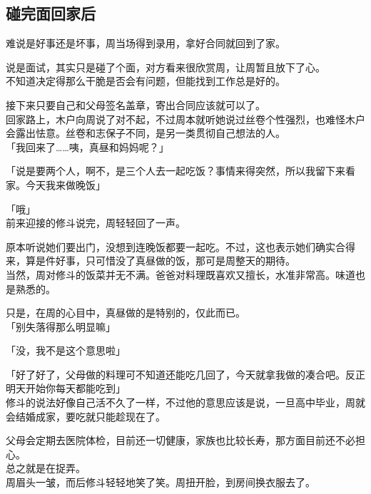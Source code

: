 \subsection{碰完面回家后}

难说是好事还是坏事，周当场得到录用，拿好合同就回到了家。

说是面试，其实只是碰了个面，对方看来很欣赏周，让周暂且放下了心。\\

不知道决定得那么干脆是否会有问题，但能找到工作总是好的。

接下来只要自己和父母签名盖章，寄出合同应该就可以了。\\

回家路上，木户向周说了对不起，不过周本就听她说过丝卷个性强烈，也难怪木户会露出怯意。丝卷和志保子不同，是另一类贯彻自己想法的人。\\

「我回来了……咦，真昼和妈妈呢？」

「说是要两个人，啊不，是三个人去一起吃饭？事情来得突然，所以我留下来看家。今天我来做晚饭」

「哦」\\

前来迎接的修斗说完，周轻轻回了一声。

原本听说她们要出门，没想到连晚饭都要一起吃。不过，这也表示她们确实合得来，算是件好事，只可惜没了真昼做的饭，那可是周整天的期待。\\

当然，周对修斗的饭菜并无不满。爸爸对料理既喜欢又擅长，水准非常高。味道也是熟悉的。

只是，在周的心目中，真昼做的是特别的，仅此而已。\\

「别失落得那么明显嘛」

「没，我不是这个意思啦」

「好了好了，父母做的料理可不知道还能吃几回了，今天就拿我做的凑合吧。反正明天开始你每天都能吃到」\\

修斗的说法好像自己活不久了一样，不过他的意思应该是说，一旦高中毕业，周就会结婚成家，要吃就只能趁现在了。

父母会定期去医院体检，目前还一切健康，家族也比较长寿，那方面目前还不必担心。\\

总之就是在捉弄。\\

周眉头一皱，而后修斗轻轻地笑了笑。周扭开脸，到房间换衣服去了。\\

